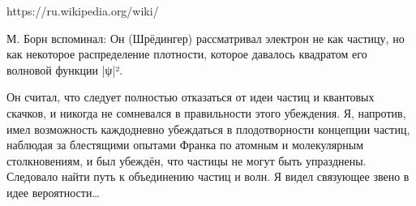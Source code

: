 https://ru.wikipedia.org/wiki/%
{
М. Борн вспоминал:
Он (Шрёдингер) рассматривал электрон не как частицу, но как некоторое распределение плотности, которое давалось квадратом его волновой функции |ψ|².

Он считал, что следует полностью отказаться от идеи частиц и квантовых скачков, и никогда не сомневался в правильности этого убеждения. Я, напротив, имел возможность каждодневно убеждаться в плодотворности концепции частиц, наблюдая за блестящими опытами Франка по атомным и молекулярным столкновениям, и был убеждён, что частицы не могут быть упразднены. Следовало найти путь к объединению частиц и волн. Я видел связующее звено в идее вероятности…
}




